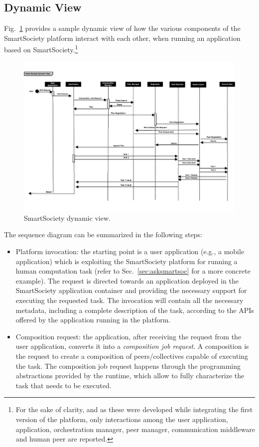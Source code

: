 \subsection{Dynamic View}
Fig.~\ref{fig:dynamic_view} provides a sample dynamic view of how the various components of the SmartSociety platform interact with each other, when running an application based on SmartSociety.\footnote{For the sake of clarity, and as these were developed while integrating the first version of the platform, only interactions among the user application, application, orchestration manager, peer manager, communication middleware and human peer are reported.} 

\begin{figure}[!hbt]
 \centering
 \includegraphics[width=1\textwidth]{figs/dynamic_view.pdf}
 \caption{SmartSociety dynamic view.}
 \label{fig:dynamic_view}
\end{figure}

The sequence diagram can be summarized in the following steps:
\begin{itemize}
\item Platform invocation: the starting point is a user application (e.g., a mobile application) which is exploiting the SmartSociety platform for running a human computation task (refer to Sec.~\ref{sec:asksmartsoc} for a more concrete example). The request is directed towards an application deployed in the SmartSociety application container and providing the necessary support for executing the requested task. The invocation will contain all the necessary metadata, including a complete description of the task, according to the APIs offered by the application running in the platform.
\item Composition request: the application, after receiving the request from the user application, converts it into a \textit{composition job request}. A composition is the request to create a composition of peers/collectives capable of executing the task. The composition job request happens through the programming abstractions provided by the runtime, which allow to fully characterize the task that needs to be executed.

\end{itemize}


